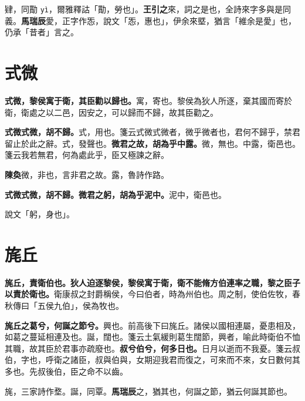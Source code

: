 \begin{quoting}肄，同勩 \texttt{yì}，爾雅釋詁「勩，勞也」。\textbf{王引之}來，詞之是也，全詩來字多與是同義。\textbf{馬瑞辰}愛，正字作㤅，說文「㤅，惠也」，伊余來塈，猶言「維余是愛」也，仍承「昔者」言之。\end{quoting}

\section{式微}


\textbf{式微，黎侯寓于衛，其臣勸以歸也。}{\footnotesize 寓，寄也。黎侯為狄人所逐，棄其國而寄於衛，衛處之以二邑，因安之，可以歸而不歸，故其臣勸之。}

\textbf{式微式微，胡不歸。}{\footnotesize 式，用也。箋云式微式微者，微乎微者也，君何不歸乎，禁君留止於此之辭。式，發聲也。}\textbf{微君之故，胡為乎中露。}{\footnotesize 微，無也。中露，衛邑也。箋云我若無君，何為處此乎，臣又極諫之辭。}

\begin{quoting}\textbf{陳奐}微，非也，言非君之故。露，魯詩作路。\end{quoting}

\textbf{式微式微，胡不歸。微君之躬，胡為乎泥中。}{\footnotesize 泥中，衛邑也。}

\begin{quoting}說文「躬，身也」。\end{quoting}

\section{旄丘}


\textbf{旄丘，責衛伯也。狄人迫逐黎侯，黎侯寓于衛，衛不能脩方伯連率之職，黎之臣子以責於衛也。}{\footnotesize 衛康叔之封爵稱侯，今曰伯者，時為州伯也。周之制，使伯佐牧，春秋傳曰「五侯九伯」，侯為牧也。}

\textbf{旄丘之葛兮，何誕之節兮。}{\footnotesize 興也。前高後下曰旄丘。諸侯以國相連屬，憂患相及，如葛之蔓延相連及也。誕，闊也。箋云土氣緩則葛生闊節，興者，喻此時衛伯不恤其職，故其臣於君事亦疏廢也。}\textbf{叔兮伯兮，何多日也。}{\footnotesize 日月以逝而不我憂。箋云叔伯，字也，呼衛之諸臣，叔與伯與，女期迎我君而復之，可來而不來，女日數何其多也。先叔後伯，臣之命不以齒。}

\begin{quoting}旄，三家詩作堥。誕，同覃。\textbf{馬瑞辰}之，猶其也，何誕之節，猶云何誕其節也。\end{quoting}

